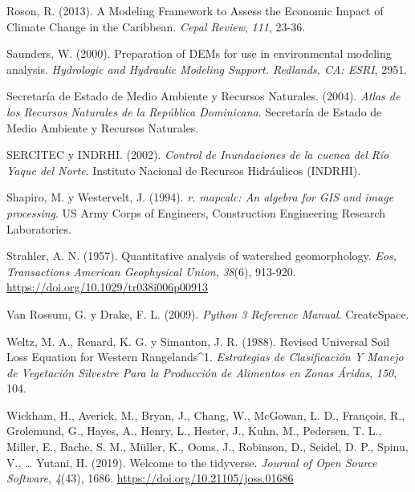 \documentclass[spanish]{article}
\newlength{\cslhangindent}
\newlength{\cslentryspacingunit} %
\newenvironment{CSLReferences}[2] %
 {%
  \setlength{\parindent}{0pt}
  \ifodd #1
  \let\oldpar\par
  \def\par{\hangindent=\cslhangindent\oldpar}
  \fi
  \setlength{\parskip}{#2\cslentryspacingunit}
 }%
 {}
\begin{document}
\begin{CSLReferences}{1}{0}
\leavevmode{}%
Roson, R. (2013). A Modeling Framework to Assess the Economic Impact of
Climate Change in the Caribbean. \emph{Cepal Review}, \emph{111}, 23-36.

\leavevmode{}%
Saunders, W. (2000). Preparation of DEMs for use in environmental
modeling analysis. \emph{Hydrologic and Hydraulic Modeling Support.
Redlands, CA: ESRI}, 2951.

\leavevmode{}%
Secretaría de Estado de Medio Ambiente y Recursos Naturales. (2004).
\emph{{Atlas de los Recursos Naturales de la República Dominicana}}.
{Secretaría de Estado de Medio Ambiente y Recursos Naturales}.

\leavevmode{}%
SERCITEC y INDRHI. (2002). \emph{{Control de Inundaciones de la cuenca
del Río Yaque del Norte}}. {Instituto Nacional de Recursos Hidráulicos
(INDRHI)}.

\leavevmode{}%
Shapiro, M. y Westervelt, J. (1994). \emph{r. mapcalc: An algebra for
GIS and image processing}. US Army Corps of Engineers, Construction
Engineering Research Laboratories.

\leavevmode{}%
Strahler, A. N. (1957). Quantitative analysis of watershed
geomorphology. \emph{Eos, Transactions American Geophysical Union},
\emph{38}(6), 913-920. \url{https://doi.org/10.1029/tr038i006p00913}

\leavevmode{}%
Van Rossum, G. y Drake, F. L. (2009). \emph{Python 3 Reference Manual}.
CreateSpace.

\leavevmode{}%
Weltz, M. A., Renard, K. G. y Simanton, J. R. (1988). Revised Universal
Soil Loss Equation for Western Rangelands{\^{}}1. \emph{Estrategias de
Clasificación Y Manejo de Vegetación Silvestre Para la Producción de
Alimentos en Zonas Áridas}, \emph{150}, 104.

\leavevmode{}%
Wickham, H., Averick, M., Bryan, J., Chang, W., McGowan, L. D.,
François, R., Grolemund, G., Hayes, A., Henry, L., Hester, J., Kuhn, M.,
Pedersen, T. L., Miller, E., Bache, S. M., Müller, K., Ooms, J.,
Robinson, D., Seidel, D. P., Spinu, V., \ldots{} Yutani, H. (2019).
Welcome to the {tidyverse}. \emph{Journal of Open Source Software},
\emph{4}(43), 1686. \url{https://doi.org/10.21105/joss.01686}


\end{CSLReferences}
\end{document}
